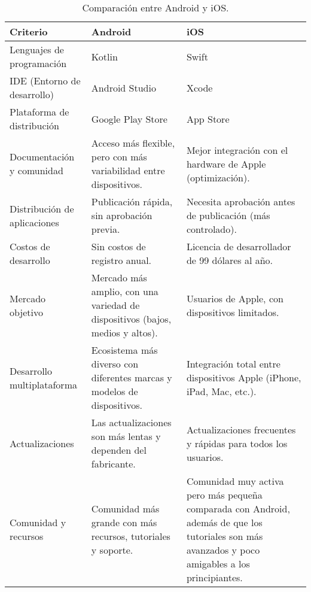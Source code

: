 \begin{table}[ht]
    \centering
    \begin{tabular}{|p{3cm}|p{5cm}|p{5cm}|}
    \hline
    \textbf{Criterio} & \textbf{Android} & \textbf{iOS} \\ \hline
    Lenguajes de programación & Kotlin & Swift \\ \hline
    IDE (Entorno de desarrollo) & Android Studio & Xcode \\ \hline
    Plataforma de distribución & Google Play Store & App Store \\ \hline
    Documentación y comunidad & Acceso más flexible, pero con más variabilidad entre dispositivos. & Mejor integración con el hardware de Apple (optimización). \\ \hline
    Distribución de aplicaciones & Publicación rápida, sin aprobación previa. & Necesita aprobación antes de publicación (más controlado). \\ \hline
    Costos de desarrollo & Sin costos de registro anual. & Licencia de desarrollador de 99 dólares al año. \\ \hline
    Mercado objetivo & Mercado más amplio, con una variedad de dispositivos (bajos, medios y altos). & Usuarios de Apple, con dispositivos limitados. \\ \hline
    Desarrollo multiplataforma & Ecosistema más diverso con diferentes marcas y modelos de dispositivos. & Integración total entre dispositivos Apple (iPhone, iPad, Mac, etc.). \\ \hline
    Actualizaciones & Las actualizaciones son más lentas y dependen del fabricante. & Actualizaciones frecuentes y rápidas para todos los usuarios. \\ \hline
    Comunidad y recursos & Comunidad más grande con más recursos, tutoriales y soporte. & Comunidad muy activa pero más pequeña comparada con Android, además de que los tutoriales son más avanzados y poco amigables a los principiantes. \\
    \hline
    \end{tabular}
    \caption{Comparación entre Android y iOS.}
    \label{tab:Tabla1}
\end{table}


